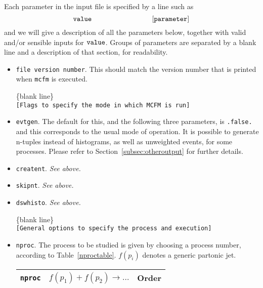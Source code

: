 \documentclass[12pt]{article}
\begin{document}
Each parameter in the input file is specified by a line such as
\begin{displaymath}
{\tt value} \hspace{3cm} {\tt [parameter]}
\end{displaymath}
and we will give a description of all the parameters below, together with
valid and/or sensible inputs for ${\tt value}$. Groups of parameters
are separated by a blank line and a description of that section, for
readability.

\begin{itemize}
\item {\tt file version number}. This should match the version number
that is printed when {\tt mcfm} is executed.

\begin{center}
\{blank line\} \\
{\tt [Flags to specify the mode in which MCFM is run] }
\end{center}

\item {\tt evtgen}. The default for this, and the following three
parameters, is {\tt .false.} and this corresponds to the usual mode
of operation. It is possible to generate n-tuples instead of histograms,
as well as unweighted events, for some processes. Please refer to
Section~\ref{subsec:otheroutput} for further details.
\item {\tt creatent}. {\it See above.}
\item {\tt skipnt}. {\it See above.}
\item {\tt dswhisto}. {\it See above.}

\begin{center}
\{blank line\} \\
{\tt [General options to specify the process and execution] }
\end{center}

\item {\tt nproc}.
The process to be studied is given by
choosing a process number, according to Table~\ref{nproctable}.
$f(p_i)$ denotes a generic partonic jet.

\begin{table}
\begin{center}
\hspace*{-1.5cm}
\begin{tabular}{|l|l|l|}
\hline
{\tt nproc} & $f(p_1)+f(p_2) \to \ldots $& Order \\
\hline
 

\end{tabular}
\end{center}
\end{table}
\end{itemize}
\end{document}
